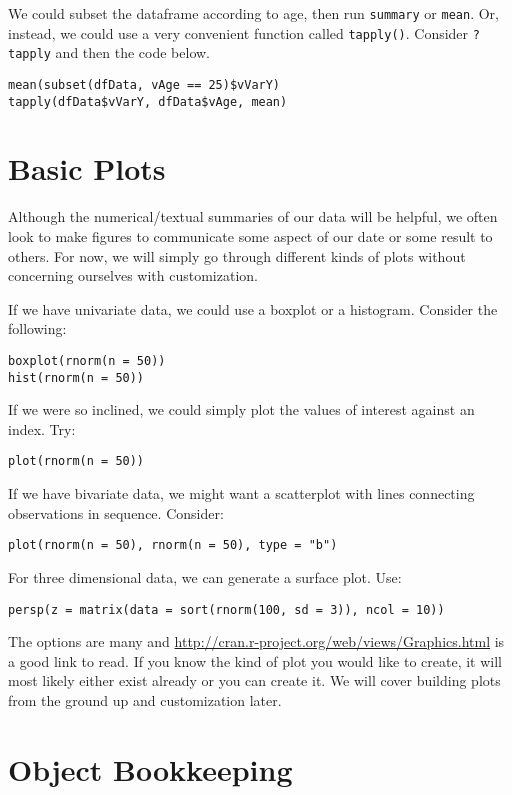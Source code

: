 We could subset the dataframe according to age, then run
\texttt{summary} or \texttt{mean}. Or, instead, we could use a very
convenient function called \texttt{tapply()}. Consider
\texttt{?tapply} and then the code below.
\begin{verbatim}
mean(subset(dfData, vAge == 25)$vVarY)
tapply(dfData$vVarY, dfData$vAge, mean)
\end{verbatim}

\section{Basic Plots}
Although the numerical/textual summaries of our data will be helpful,
we often look to make figures to communicate some aspect of our date
or some result to others. For now, we will simply go through different
kinds of plots without concerning ourselves with customization.

If we have univariate data, we could use a boxplot or a histogram. Consider
the following:
\begin{verbatim}
boxplot(rnorm(n = 50))
hist(rnorm(n = 50))
\end{verbatim}

If we were so inclined, we could simply plot the values of interest
against an index. Try:
\begin{verbatim}
plot(rnorm(n = 50))
\end{verbatim}

If we have bivariate data, we might want a scatterplot with lines
connecting observations in sequence. Consider:
\begin{verbatim}
plot(rnorm(n = 50), rnorm(n = 50), type = "b")
\end{verbatim}

For three dimensional data, we can generate a surface plot. Use:
\begin{verbatim}
persp(z = matrix(data = sort(rnorm(100, sd = 3)), ncol = 10))
\end{verbatim}

The options are many and
\url{http://cran.r-project.org/web/views/Graphics.html} is a good link
to read. If you know the kind of plot you would like to create, it
will most likely either exist already or you can create it. We will
cover building plots from the ground up and customization later.

\section{Object Bookkeeping}

